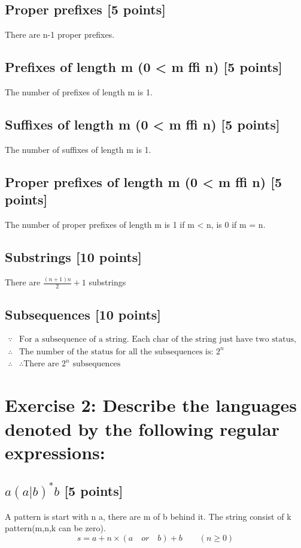 \documentclass{article}
\begin{document}
        \subsection{Proper prefixes [5 points]}
        There are n-1 proper prefixes.
        \subsection{Prefixes of length m (0 < m ffi n) [5 points]}
        The number of prefixes of length m is 1.
        \subsection{Suffixes of length m (0 < m ffi n) [5 points]}
        The number of suffixes of length m is 1.
        \subsection{Proper prefixes of length m (0 < m ffi n) [5 points]}
        The number of proper prefixes of length m is 1 if m < n, is 0 if m = n.
        \subsection{Substrings [10 points]}
        There are $\frac{(n+1)n}{2} + 1$ substrings
        \subsection{Subsequences [10 points]}
        \begin{align*}
            \because &\text{For a subsequence of a string. Each char of the string just have two status, in the sequence or not in it.}\\
            \therefore &\text{The number of the status for all the subsequences is: } 2^n\\
            \therefore &\text{∴There are } 2^n \text{ subsequences}
        \end{align*}
    \section{Exercise 2: Describe the languages denoted by the following regular expressions:}
        \subsection{$a(a|b)^*b$ [5 points]}
            A pattern is start with n a, there are m of b behind it. The string consist of k pattern(m,n,k can be zero).
            $$s = a + n × (a\quad or\quad b) + b\qquad (n\geq 0)$$
\end{document}
